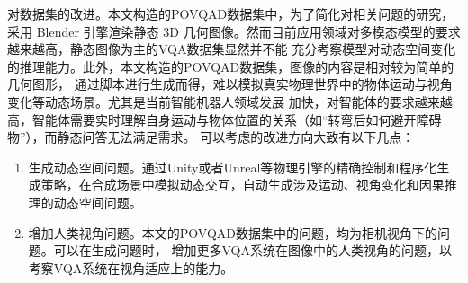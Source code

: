 对数据集的改进。本文构造的POVQAD数据集中，为了简化对相关问题的研究，采用 Blender 引擎渲染静态 3D 几何图像。然而目前应用领域对多模态模型的要求越来越高，静态图像为主的VQA数据集显然并不能
充分考察模型对动态空间变化的推理能力。此外，本文构造的POVQAD数据集，图像的内容是相对较为简单的几何图形，
通过脚本进行生成而得，难以模拟真实物理世界中的物体运动与视角变化等动态场景。尤其是当前智能机器人领域发展
加快，对智能体的要求越来越高，智能体需要实时理解自身运动与物体位置的关系（如“转弯后如何避开障碍物”），而静态问答无法满足需求。
可以考虑的改进方向大致有以下几点：
\begin{enumerate}[itemsep=0pt,parsep=0pt]
    \item 生成动态空间问题。通过Unity或者Unreal等物理引擎的精确控制和程序化生成策略，在合成场景中模拟动态交互，自动生成涉及运动、视角变化和因果推理的动态空间问题。
    \item 增加人类视角问题。本文的POVQAD数据集中的问题，均为相机视角下的问题。可以在生成问题时，
增加更多VQA系统在图像中的人类视角的问题，以考察VQA系统在视角适应上的能力。
\end{enumerate}